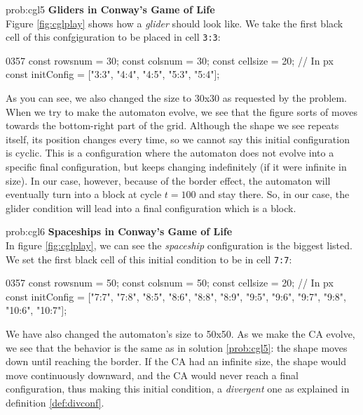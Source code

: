\begin{sol}{prob:cgl5}
\textbf{Gliders in Conway's Game of Life}\\
Figure \ref{fig:cglplay} shows how a \textit{glider} should look like.  We take
the first black cell of this confgiguration to be placed in cell \texttt{3:3}:
\begin{codeh2}{0}{3}{5}{7}
const rowsnum = 30;
const colsnum = 30;
const cellsize = 20; // In px
const initConfig = ["3:3", "4:4", "4:5", "5:3", "5:4"];
\end{codeh2}
As you can see, we also changed the size to 30x30 as requested by the problem.
When we try to make the automaton evolve, we see that the figure sorts of moves towards the bottom-right
part of the grid. Although the shape we see repeats itself, its position changes every time,
so we cannot say this initial configuration is cyclic. This is a configuration where the automaton does
not evolve into a specific final configuration, but keeps changing indefinitely (if it were infinite in size).
In our case, however, because of the border effect, the automaton will eventually turn into a block at cycle
$t=100$ and stay there. So, in our case, the glider condition will lead into a final configuration which is
a block.
\end{sol}

\begin{sol}{prob:cgl6}
\textbf{Spaceships in Conway's Game of Life}\\
In figure \ref{fig:cglplay}, we can see the \textit{spaceship} configuration is the biggest listed.
We set the first black cell of this initial condition to be in cell \texttt{7:7}:
\begin{codeh2}{0}{3}{5}{7}
const rowsnum = 50;
const colsnum = 50;
const cellsize = 20; // In px
const initConfig = ["7:7", "7:8", "8:5", "8:6", "8:8", "8:9", "9:5", "9:6", "9:7", "9:8", "10:6", "10:7"];
\end{codeh2}
We have also changed the automaton's size to 50x50.
As we make the CA evolve, we see that the behavior is the same as in solution \ref{prob:cgl5}: the shape
moves down until reaching the border. If the CA had an infinite size, the shape would move continuously
downward, and the CA would never reach a final configuration, thus making this initial condition, a
\textit{divergent} one as explained in definition \ref{def:divconf}.
\end{sol}
